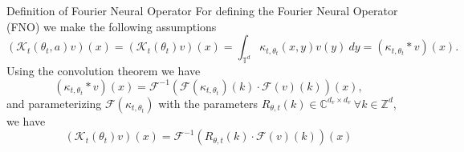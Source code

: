 \documentclass{beamer}
\newcommand{\numberset}{\mathbb}
\newcommand{\Z}{\numberset{Z}}
\newcommand{\R}{\numberset{R}}
\newcommand{\C}{\numberset{C}}
\begin{document}




\begin{frame}{Definition of Fourier Neural Operator}
	For defining the Fourier Neural Operator (FNO) we make the following assumptions
	\[ (\mathcal{K}_t(\theta_t, a)v)(x) = (\mathcal{K}_t(\theta_t)v)(x) = \int_{\mathbb{T}^d} \kappa_{t,\theta_t}(x,y) v(y) \ dy = (\kappa_{t, \theta_t} * v)(x)  .\]
	\pause
	Using the convolution theorem we have
	\[ (\kappa_{t, \theta_t} * v)(x) =  \mathcal{F}^{-1}\left( \mathcal{F}( \kappa_{t,\theta_t}) (k) \cdot \mathcal{F}(v)(k) \right)(x), \]
	and parameterizing $\mathcal{F}( \kappa_{t, \theta_t} )$ with the parameters $R_{\theta, t}(k) \in \C^{d_v \times d_v} \ \forall k \in \Z^d $, we have 
	\[  (\mathcal{K}_t(\theta_t)v)(x)= \mathcal{F}^{-1}\left( R_{\theta,t}(k) \cdot \mathcal{F}(v)(k) \right)(x) \]
\end{frame}
\end{document}
